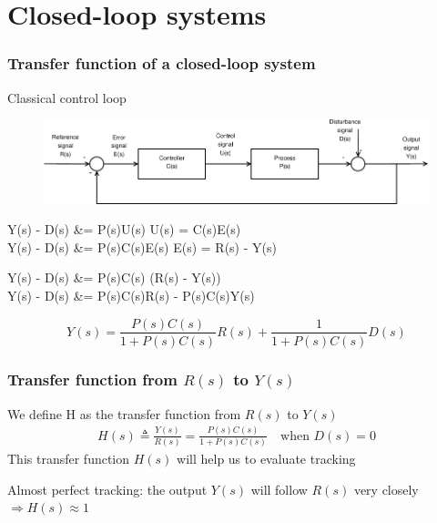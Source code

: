 \section{Closed-loop systems}
\begin{frame}
	\frametitle{Transfer function of a closed-loop system}
	\begin{block}{Classical control loop}
		\begin{figure}
			\centering
			\includegraphics[width=1\linewidth]{Closed-Loop}
			\label{fig:Closed-Loop2}
		\end{figure}
		\vspace{0.2em}
	\end{block}
	\begin{block}{}
		\begin{flalign*}
			Y(s) - D(s) &= P(s)U(s) \quad {} U(s) = C(s)E(s) \\
			Y(s) - D(s) &= P(s)C(s)E(s) \quad {} E(s) = R(s) - Y(s) \\
		\end{flalign*}
	\end{block}
\end{frame}
\begin{frame}
	\begin{block}{}
		\begin{flalign*}
			Y(s) - D(s) &= P(s)C(s) (R(s) - Y(s)) \\
			Y(s) - D(s) &= P(s)C(s)R(s) - P(s)C(s)Y(s) \\
		\end{flalign*}
	\end{block}
	\begin{alertblock}{}
		\[
			Y(s) = \frac{P(s)C(s)}{1 + P(s)C(s)}R(s) + \frac{1}{1 + P(s)C(s)}D(s)
		\]
	\end{alertblock}
\end{frame}


\begin{frame}
	\frametitle{Transfer function from $R(s)$ to $Y(s)$}
	\begin{definition}
		We define H as the transfer function from $R(s)$ to $Y(s)$
		\begin{align*}
		H(s) \triangleq \frac{Y(s)}{R(s)} = \frac{P(s)C(s)}{1 + P(s) C(s)} \quad \text{when } D(s) = 0
		\end{align*}
		This transfer function $H(s)$ will help us to evaluate tracking
		
		Almost perfect tracking: the output $Y(s)$ will follow $R(s)$ very closely $\Rightarrow H(s) \approx 1$
	\end{definition}
	
\end{frame}


